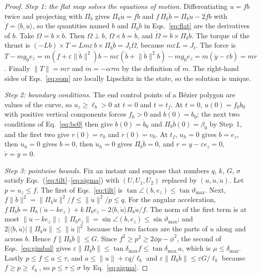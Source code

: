 \documentclass[10pt,letterpaper]{article}
\theoremstyle{aiaa}
\newcommand{\norm}[1]{\lVert #1\rVert}
\newcommand{\ip}[2]{\langle #1,#2\rangle}
\newcommand{\ez}{e_z}
\newcommand{\Pib}{\Pi_b}
\newcommand{\dmax}{\delta_{\max}}
\newcommand{\thmax}{\vartheta_{\max}}
\begin{document}
\begin{proof}
\emph{Step 1: the flat map solves the equations of motion.} Differentiating $u=fb$ twice and projecting with $\Pib$ gives
$\Pib\dot u=f\dot b$ and $f\,\Pib\ddot b=\Pib\ddot u-2\dot f\dot b$ with $\dot f=\ip b{\dot u}$, so the quantities named $\dot b$
and $\Pib\ddot b$ in Eqs.~\eqref{eq:flat} are the derivatives of $b$. Take $\Omega=b\times\dot b$. Then $\Omega\perp b$,
$\Omega\times b=\dot b$, and $\dot\Omega=b\times\Pib\ddot b$. The torque of the thrust is $(-Lb)\times T=Lm\varepsilon\,b\times\Pib\ddot b
=J_t\dot\Omega$, because $m\varepsilon L=J_t$. The force is $T-mg_0\ez=m(f+\varepsilon\norm{\dot b}^2)b-m\varepsilon(\ddot b+\norm{\dot b}^2b)-mg_0\ez
=m(\ddot y-\varepsilon\ddot b)=m\ddot r$. Finally $\norm T=m\tau$ and $\dot m=-\alpha\tau m$ by the definition of $m$. The right-hand
sides of Eqs.~\eqref{eq:eom} are locally Lipschitz in the state, so the solution is unique.

\emph{Step 2: boundary conditions.} The end control points of a B\'ezier polygon are values of the curve, so $u_z\ge\ell_b>0$ at
$t=0$ and $t=t_f$. At $t=0$, $u(0)=f_0b_0$ with positive vertical components forces $f_0>0$ and $b(0)=b_0$; the next two
conditions of Eq.~\eqref{eq:bc0} then give $\dot b(0)=\dot b_0$ and $\Pib\ddot b(0)=\beta_0$ by Step~1, and the first two give
$r(0)=r_0$ and $\dot r(0)=v_0$. At $t_f$, $u_h=0$ gives $b=\ez$, then $\dot u_h=0$ gives $\dot b=0$, then $\ddot u_h=0$ gives
$\Pib\ddot b=0$, and $r=y-\varepsilon\ez=0$, $\dot r=\dot y=0$.

\emph{Step 3: pointwise bounds.} Fix an instant and suppose that numbers $q$, $k$, $G$, $\sigma$ satisfy
Eqs.~(\ref{eq:tilt}--\ref{eq:sigma}) with $(U,U_1,U_2)$ replaced by $(u,\dot u,\ddot u)$. Let $p=u_z\le f$. The first of
Eqs.~\eqref{eq:tilt} is $\tan\angle(b,\ez)\le\tan\thmax$. Next, $f\norm{\dot b}^2=\norm{\Pib\dot u}^2/f\le\norm{\dot u}^2/p\le q$.
For the angular acceleration, $f\,\Pib\ddot b=\Pib(\ddot u-k\ez)+k\,\Pib\ez-2\ip b{\dot u}\Pib\dot u/f$. The norm of the first term is at
most $\norm{\ddot u-k\ez}$; $\norm{\Pib\ez}=\sin\angle(b,\ez)\le\sin\thmax$; and
$2|\ip b{\dot u}|\norm{\Pib\dot u}\le\norm{\dot u}^2$ because the two factors are the parts of $\dot u$ along and across $b$. Hence
$f\norm{\Pib\ddot b}\le G$. Since $f^2\ge p^2\ge2\phi p-\phi^2$, the second of Eqs.~\eqref{eq:gimbal} gives
$\varepsilon\norm{\Pib\ddot b}\le\tan\dmax f\le\tan\dmax\,a$, which is $\mu\le\dmax$. Lastly $p\le f\le a\le\tau$, and
$a\le\norm u+\varepsilon q/\ell_b$ and $\varepsilon\norm{\Pib\ddot b}\le\varepsilon G/\ell_b$ because $f\ge p\ge\ell_b$, so
$p\le\tau\le\sigma$ by Eq.~\eqref{eq:sigma}.


\end{proof}
\end{document}
